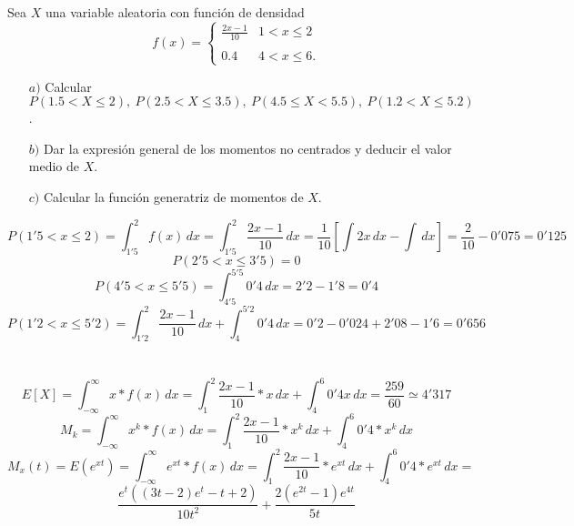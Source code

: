 \problem

Sea $X$  una variable aleatoria  con funci{\'o}n de densidad
$$
f(x) = \left \{
\begin{array}{lc}
\displaystyle{\frac{2x-1}{10}} & 1<x \leq 2 \\
\ & \ \\
\displaystyle{0\mbox{.}4} & 4 < x \leq 6.
\end{array}
\right.
$$
\begin{enumerate}\item [$a)$] Calcular \ $P(1\mbox{.}5 < X \leq 2) ,\  P(2\mbox{.}5<X \leq 3\mbox{.}5) ,\
	P(4\mbox{.}5 \leq X < 5\mbox{.}5) ,\  P(1\mbox{.}2 < X \leq
	5\mbox{.}2)$.
	\item [$b)$] Dar la expresi{\'o}n general de los momentos no centrados y deducir el valor  medio de $X$.
	\item [$c)$] Calcular la funci{\'o}n generatriz de momentos de $X$.
\end{enumerate}

\subproblem
\[ P(1'5 < x \leq 2) = \int_{1'5}^{2} f(x) \,dx  = \int_{1'5}^{2} \frac{2x-1}{10} \,dx = \frac{1}{10}[\int 2x \,dx - \int \,dx] = \frac{2}{10} - 0'075 = 0'125\] 
\[P(2'5<x\leq 3'5) = 0\] 
\[P(4'5<x\leq5'5) = \int_{4'5}^{5'5} 0'4 \,dx = 2'2 - 1'8 = 0'4 \]
\[P(1'2 < x \leq 5'2) = \int_{1'2}^2 \frac{2x-1}{10} \,dx + \int_4^{5'2} 0'4 \,dx = 0'2 - 0'024 + 2'08 - 1'6 = 0'656\] \\ \\
\subproblem
\[E[X] = \int_{-\infty}^\infty x*f(x) \,dx = \int_1^2 \frac{2x-1}{10}*x \,dx + \int_4^6 0'4x \,dx = \frac{259}{60} \simeq 4'317 \] 
\[ M_k = \int_{-\infty}^\infty x^k * f(x) \,dx = \int_1^2 \frac{2x-1}{10}* x^k \,dx + \int_4^6 0'4*x^k \,dx \]
\subproblem
\[M_x(t) = E(e^{xt}) = \int_{-\infty}^{\infty} e^{xt} * f(x) \,dx = \int_1^2 \frac{2x-1}{10}*e^{xt} \,dx + \int_4^6 0'4 * e^{xt} \,dx = \] \[ \frac{e^t((3t-2)e^t-t+2)}{10t^2}+ \frac{2(e^{2t}-1)e^{4t}}{5t}\]
